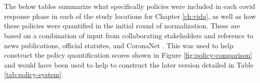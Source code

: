 \chapter{} \label{app:policy-summary}

The below tables summarize what specifically policies were included in each \ac{covid} response phase in each of the study locations for Chapter \ref{ch:vida}, as well as how these policies were quantified in the initial round of normalization. These are based on a combination of input from collaborating stakeholders and reference to news publications, official statutes, and CoronaNet \cite{CoronaNetResearchProject}. This was used to help construct the policy quantification scores shown in Figure \ref{fig:policy-comparison} and would have been used to help to construct the later version detailed in Table \ref{tab:policy-system}.

